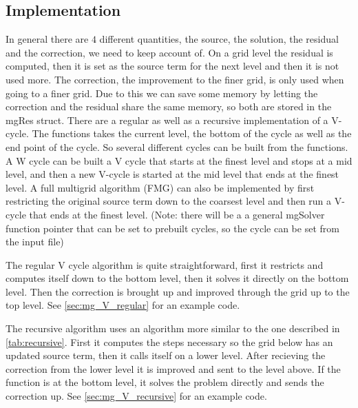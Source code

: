 		\subsection{Implementation}
			In general there are \(4\) different quantities, the source, the solution, the residual and the correction, we need to keep account of.
			On a grid level the residual is computed, then it is set as the source term for the next level and then it is not used more.
			The correction, the improvement to the finer grid, is only used when going to a finer grid. Due to this we can save some memory by
			letting the correction and the residual share the same memory, so both are stored in the mgRes struct. There are a regular as well as a recursive implementation
			of a V-cycle. The functions takes the current level, the bottom of the cycle as well as the end point of the cycle. So several different cycles
			can be built from the functions. A W cycle can be built a V cycle that starts at the finest level and stops at a mid level, and then a new V-cycle is started at
			the mid level that ends at the finest level. A full multigrid algorithm (FMG) can also be implemented by first restricting the original source term down to the coarsest
			level and then run a V-cycle that ends at the finest level.
			(Note: there will be a a general mgSolver function pointer that can be set to prebuilt cycles, so the cycle can be set from the input file)

			The regular V cycle algorithm is quite straightforward, first it restricts and computes itself down to the bottom level,
			then it solves it directly on the bottom level. Then the correction is brought up and improved through the grid up to the top level.
			See \cref{sec:mg_V_regular} for an example code.

			The recursive algorithm uses an algorithm more similar to the one described in \cref{tab:recursive}. First it computes the steps necessary
			so the grid below has an updated source term, then it calls itself on a lower level. After recieving the correction from
			the lower level it is improved and sent to the level above. If the function is at the bottom level, it solves the problem directly and sends
			the correction up. See \cref{sec:mg_V_recursive} for an example code.




\newpage
